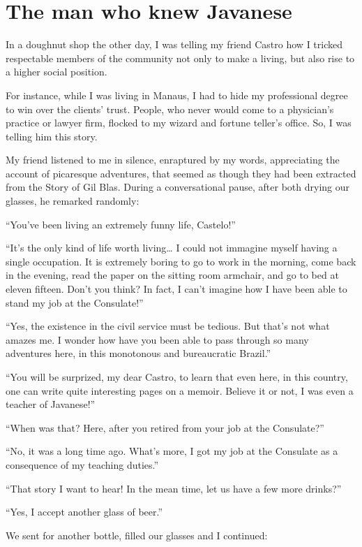 \documentclass[a4paper,12pt]{book}
\begin{document}
\chapter{The man who knew Javanese}
In a doughnut shop the other day,
I was telling my friend Castro
how I tricked respectable members of the
community not only to make a living,
but also rise to a higher social position.

For instance, while I was living in Manaus,
I had to hide my professional degree to win
over the clients' trust. People, who never would
come to a physician's practice or lawyer firm,
flocked to my wizard and fortune teller's office.
So, I was telling him this story.

My friend listened to me in silence,
enraptured by my words,
appreciating the account of picaresque adventures,
that seemed as though they had been
extracted from the Story of Gil Blas.
During a conversational pause,
after both drying our glasses,
he remarked randomly:

``You've been living an extremely funny life, Castelo!''

``It's the only kind of life worth living\ldots
I could not immagine
myself having a single occupation.
It is extremely boring
to go to work in the morning,
come back in the evening, read the paper
on the sitting room armchair,
and go to bed at eleven fifteen.
Don't you think?
In fact, I can't imagine how I have been
able to stand my job at the Consulate!''


``Yes, the existence in the civil service
must be tedious. But that's not
what amazes me. I wonder how have you been
able to pass through so many adventures here,
in this monotonous and bureaucratic Brazil.''

``You will be surprized, my dear Castro,
to learn that even here, in this country,
one can write quite interesting pages on a
memoir. Believe it or not,
I was even a teacher of Javanese!''

``When was that? Here, after you retired
from your job at the Consulate?''


``No, it was a long time ago.
What's more, I got my job at the
Consulate as a consequence of my
teaching duties.''

``That story I want to hear! In the mean time,
let us have a few more drinks?''

``Yes, I accept another glass of beer.''

We sent for another bottle, filled our glasses
and I continued:
\end{document}
